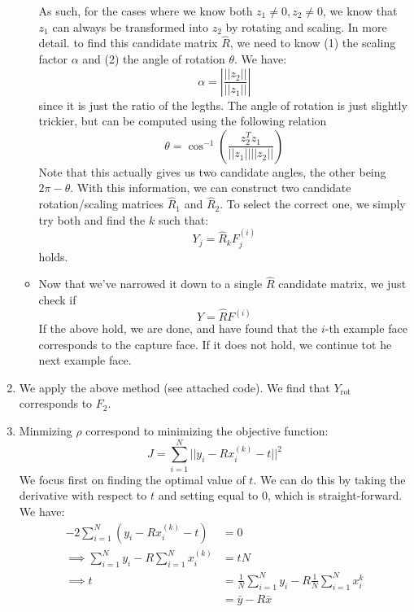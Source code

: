 \documentclass[12pt]{exam}
\begin{document}
\begin{questions}
\begin{solution}
\begin{enumerate}[label=(\alph*)]
\begin{itemize}
        As such, for the cases where we know both $z_1 \neq 0, z_2 \neq 0$, we know that $z_1$ can always be transformed into $z_2$ by rotating and scaling. In more detail. to find this candidate matrix $\hat{R}$, we need to know (1) the scaling factor $\alpha$ and (2) the angle of rotation $\theta$. We have:
         \[
          \alpha = \left| \frac{||z_2||}{||z_1||} \right|
         \]
         since it is just the ratio of the legths. The angle of rotation is just slightly trickier, but can be computed using the following relation
         \[
          \theta = \cos^{-1} \left(\frac{z_2^Tz_1}{||z_1||||z_2||}\right)
         \]
         Note that this actually gives us two candidate angles, the other being $2\pi - \theta$. With this information, we can construct two candidate rotation/scaling matrices $\hat{R}_1$ and $\hat{R}_2$. To select the correct one, we simply try both and find the $k$ such that:
         \[ 
          Y_j = \hat{R}_kF^{(i)}_j
         \]
         holds.
         \item Now that we've narrowed it down to a single $\hat{R}$ candidate matrix, we just check if
         \[
          Y = \hat{R}F^{(i)}
         \]
         If the above hold, we are done, and have found that the $i$-th example face corresponds to the capture face. If it does not hold, we continue tot he next example face.
      \end{itemize}
      \item We apply the above method (see attached code). We find that $Y_{\text{rot}}$ corresponds to $F_2$.
      \item
        Minmizing $\rho$ correspond to minimizing the objective function:
        \[
          J = \sum_{i=1}^N ||y_i - Rx_i^{(k)} - t||^2
         \]
        We focus first on finding the optimal value of $t$. We can do this by taking the derivative with respect to $t$ and setting equal to $0$, which is straight-forward. We have:
        \begin{align*}
          -2 \sum_{i=1}^N (y_i - Rx_i^{(k)} - t) &= 0 \\
          \implies \sum_{i=1}^N y_i - R\sum_{i=1}^N x_i^{(k)} &= tN \\
          \implies t &= \frac{1}{N} \sum_{i=1}^N y_i - R \frac{1}{N}\sum_{i=1}^{N} x_i^{k} \\
          &= \bar{y} - R\bar{x}
        \end{align*}


\end{enumerate}
\end{solution}
\end{questions}
\end{document}

